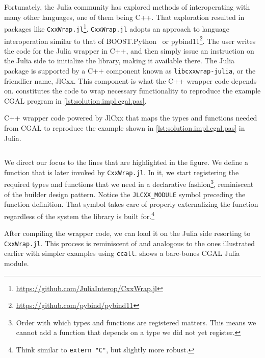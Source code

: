 Fortunately, the Julia community has explored methods of interoperating with
many other languages, one of them being C++.  That exploration resulted in
packages like 
\texttt{CxxWrap.jl}\footnote{\url{https://github.com/JuliaInterop/CxxWrap.jl}}.
\texttt{CxxWrap.jl} adopts an approach to language interoperation similar to
that of BOOST.Python~\cite{Abrahams:2003:BHSBP} or
pybind11\footnote{\url{https://github.com/pybind/pybind11}}.  The user writes
the code for the Julia wrapper in C++, and then simply issue an instruction on
the Julia side to initialize the library, making it available there.  The Julia
package is supported by a C++ component known as \texttt{libcxxwrap-julia}, or
the friendlier name, JlCxx. This component is what the C++ wrapper code depends
on.   constitutes the code to wrap
necessary functionality to reproduce the example \ac{CGAL} program in
\cref{lst:solution.impl.cgal.pas}.

\begin{listing}[p]
  \caption[Wrapper CxxWrap code for Three points and one segment]{
    C++ wrapper code powered by JlCxx that maps the types and functions needed
    from \acs{CGAL} to reproduce the example shown in
    \cref{lst:solution.impl.cgal.pas} in Julia.}%
  \label{lst:solution.impl.jlcgal.jlcxx}
  \inputminted[fontsize=\small,highlightlines={24,30-34,36-38,40-43,46-49}]%
    {cpp}{cpp/cgal_julia.cpp}
\end{listing}

We direct our focus to the lines that are highlighted in the figure.  We define
a function that is later invoked by \texttt{CxxWrap.jl}.  In it, we start
registering the required types and functions that we need in a declarative
fashion\footnote{Order with which types and functions are registered matters.
This means we cannot add a function that depends on a type we did not yet
register.}, reminiscent of the builder design pattern.  Notice the
\texttt{JLCXX\_MODULE} symbol preceding the function definition.  That symbol
takes care of properly externalizing the function regardless of the system the
library is built for.\footnote{Think similar to \texttt{extern "C"}, but
slightly more robust.}

After compiling the wrapper code, we can load it on the Julia side resorting to
\texttt{CxxWrap.jl}.  This process is reminiscent of and analogous to the ones
illustrated earlier with simpler examples using \texttt{ccall}.
 shows a bare-bones CGAL Julia module.

